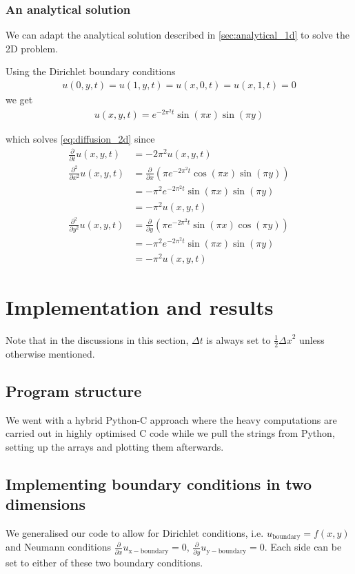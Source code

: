 \documentclass[10pt,a4paper]{article}
\newcommand{\dt}{{\Delta t}}
\newcommand{\dx}{{\Delta x}}
\newcommand{\fracpt}{\frac{\partial}{\partial t}}
\newcommand{\fracpx}{\frac{\partial}{\partial x}}
\newcommand{\fracpy}{\frac{\partial}{\partial y}}
\newcommand{\fracpxx}{\frac{\partial^2}{\partial x^2}}
\newcommand{\fracpyy}{\frac{\partial^2}{\partial y^2}}
\begin{document}
\subsubsection{An analytical solution}
We can adapt the analytical solution described in \vref{sec:analytical_1d} to solve the 2D problem.

Using the Dirichlet boundary conditions
\begin{align}
u(0, y, t) = u(1, y, t) = u(x, 0, t) = u(x, 1, t) = 0
\end{align}
we get
\begin{align}\label{eq:analytical_2d}
    u(x, y, t) = e^{-2\pi^2 t} \sin(\pi x) \sin(\pi y)
\end{align}

which solves \vref{eq:diffusion_2d} since
\begin{align}
\fracpt u(x, y, t) &= -2\pi^2 u(x, y, t) \\
\fracpxx u(x, y, t) &= \fracpx \left( \pi e^{-2\pi^2 t} \cos(\pi x) \sin(\pi y) \right) \\
&= -\pi^2 e^{-2\pi^2 t} \sin(\pi x) \sin(\pi y) \\
&= -\pi^2 u(x, y, t) \\
\fracpyy u(x, y, t) &= \fracpy \left( \pi e^{-2\pi^2 t} \sin(\pi x) \cos(\pi y) \right) \\
&= -\pi^2 e^{-2\pi^2 t} \sin(\pi x) \sin(\pi y) \\
&= -\pi^2 u(x, y, t)
\end{align}



\section{Implementation and results}\label{sec:implementation_and_results}
Note that in the discussions in this section, $\dt$ is always set to $\frac{1}{2}\dx^2$ unless otherwise mentioned.

\subsection{Program structure}
We went with a hybrid Python-C approach where the heavy computations are carried out in highly optimised C code while we pull the strings from Python, setting up the arrays and plotting them afterwards.


\subsection{Implementing boundary conditions in two dimensions}
We generalised our code to allow for Dirichlet conditions, i.e. $u_{\mathrm{boundary}} = f(x, y)$ and Neumann conditions $\fracpx u_{\mathrm{x-boundary}} = 0$, $\fracpy u_{\mathrm{y-boundary}} = 0$. Each side can be set to either of these two boundary conditions.
\end{document}

